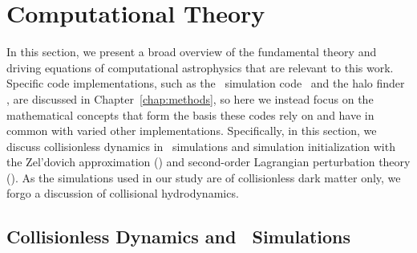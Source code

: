 
%
%

\section{Computational Theory}
\label{sec:computational_theory}



In this section, we present a broad overview of the fundamental theory and driving equations of computational astrophysics that are relevant to this work.  Specific code implementations, such as the \nbody\ simulation code \gadgettwo\ and the halo finder \rockstar, are discussed in Chapter~\ref{chap:methods}, so here we instead focus on the mathematical concepts that form the basis these codes rely on and have in common with varied other implementations.  Specifically, in this section, we discuss collisionless dynamics in \nbody\ simulations and simulation initialization with the Zel'dovich approximation (\za) and second-order Lagrangian perturbation theory (\lpt).  As the simulations used in our study are of collisionless dark matter only, we forgo a discussion of collisional hydrodynamics.




\subsection{Collisionless Dynamics and \nbody\ Simulations}
\label{subsec:computational_theory--nbody_simulations}


